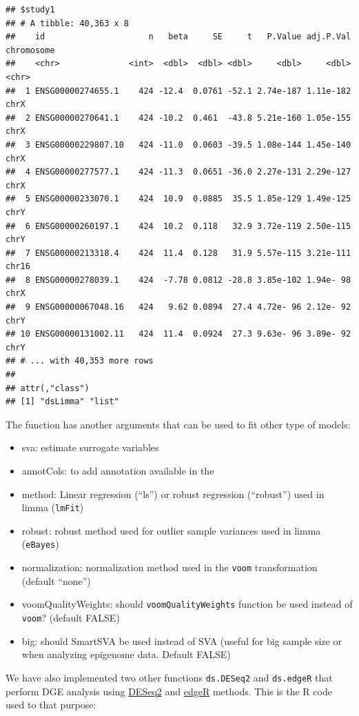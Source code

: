 \documentclass[
]{book}
\providecommand{\tightlist}{%
  \setlength{\itemsep}{0pt}\setlength{\parskip}{0pt}}
\begin{document}
\begin{verbatim}
## $study1
## # A tibble: 40,363 x 8
##    id                     n   beta     SE     t   P.Value adj.P.Val chromosome
##    <chr>              <int>  <dbl>  <dbl> <dbl>     <dbl>     <dbl> <chr>     
##  1 ENSG00000274655.1    424 -12.4  0.0761 -52.1 2.74e-187 1.11e-182 chrX      
##  2 ENSG00000270641.1    424 -10.2  0.461  -43.8 5.21e-160 1.05e-155 chrX      
##  3 ENSG00000229807.10   424 -11.0  0.0603 -39.5 1.08e-144 1.45e-140 chrX      
##  4 ENSG00000277577.1    424 -11.3  0.0651 -36.0 2.27e-131 2.29e-127 chrX      
##  5 ENSG00000233070.1    424  10.9  0.0885  35.5 1.85e-129 1.49e-125 chrY      
##  6 ENSG00000260197.1    424  10.2  0.118   32.9 3.72e-119 2.50e-115 chrY      
##  7 ENSG00000213318.4    424  11.4  0.128   31.9 5.57e-115 3.21e-111 chr16     
##  8 ENSG00000278039.1    424  -7.78 0.0812 -28.8 3.85e-102 1.94e- 98 chrX      
##  9 ENSG00000067048.16   424   9.62 0.0894  27.4 4.72e- 96 2.12e- 92 chrY      
## 10 ENSG00000131002.11   424  11.4  0.0924  27.3 9.63e- 96 3.89e- 92 chrY      
## # ... with 40,353 more rows
## 
## attr(,"class")
## [1] "dsLimma" "list"
\end{verbatim}

The function has another arguments that can be used to fit other type of models:

\begin{itemize}
\tightlist
\item
  sva: estimate surrogate variables
\item
  annotCols: to add annotation available in the
\item
  method: Linear regression (``ls'') or robust regression (``robust'') used in limma (\texttt{lmFit})
\item
  robust: robust method used for outlier sample variances used in limma (\texttt{eBayes})
\item
  normalization: normalization method used in the \texttt{voom} transformation (default ``none'')
\item
  voomQualityWeights: should \texttt{voomQualityWeights} function be used instead of \texttt{voom}? (default FALSE)
\item
  big: should SmartSVA be used instead of SVA (useful for big sample size or when analyzing epigenome data. Default FALSE)
\end{itemize}

We have also implemented two other functions \texttt{ds.DESeq2} and \texttt{ds.edgeR} that perform DGE analysis using \href{https://www.bioconductor.org/packages/devel/bioc/vignettes/DESeq2/inst/doc/DESeq2.html}{DESeq2} and \href{https://www.bioconductor.org/packages/release/bioc/vignettes/edgeR/inst/doc/edgeRUsersGuide.pdf}{edgeR} methods. This is the R code used to that purpose:
\end{document}
